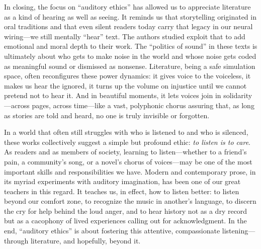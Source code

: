 \documentclass[12pt]{report}
\begin{document}
In closing, the focus on “auditory ethics” has allowed us to appreciate literature as a kind of hearing as well as seeing. It reminds us that storytelling originated in oral traditions and that even silent readers today carry that legacy in our neural wiring—we still mentally “hear” text. The authors studied exploit that to add emotional and moral depth to their work. The “politics of sound” in these texts is ultimately about who gets to make noise in the world and whose noise gets coded as meaningful sound or dismissed as nonsense. Literature, being a safe simulation space, often reconfigures these power dynamics: it gives voice to the voiceless, it makes us hear the ignored, it turns up the volume on injustice until we cannot pretend not to hear it. And in beautiful moments, it lets voices join in solidarity—across pages, across time—like a vast, polyphonic chorus assuring that, as long as stories are told and heard, no one is truly invisible or forgotten.

In a world that often still struggles with who is listened to and who is silenced, these works collectively suggest a simple but profound ethic: \textit{to listen is to care}. As readers and as members of society, learning to listen—whether to a friend’s pain, a community’s song, or a novel’s chorus of voices—may be one of the most important skills and responsibilities we have. Modern and contemporary prose, in its myriad experiments with auditory imagination, has been one of our great teachers in this regard. It teaches us, in effect, how to listen better: to listen beyond our comfort zone, to recognize the music in another’s language, to discern the cry for help behind the loud anger, and to hear history not as a dry record but as a cacophony of lived experiences calling out for acknowledgment. In the end, “auditory ethics” is about fostering this attentive, compassionate listening—through literature, and hopefully, beyond it.
\end{document}
